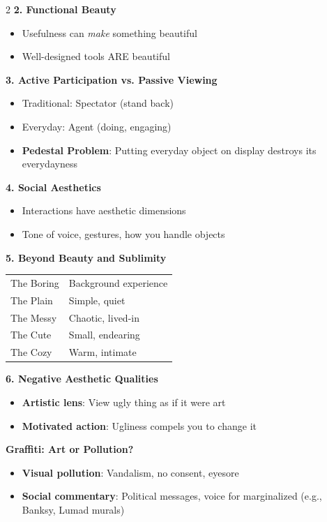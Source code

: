 \documentclass[11pt,letterpaper]{article}
\newcommand{\mysubsection}[1]{%
    \vspace{-0.2em}
    {\bfseries\color{sectioncolor}#1}%
    \vspace{0.1em}
}
\begin{document}
\begin{multicols*}{2}
\textbf{2. Functional Beauty}
\begin{itemize}[leftmargin=*, noitemsep, topsep=0pt]
    \item Usefulness can \textit{make} something beautiful
    \item Well-designed tools ARE beautiful
\end{itemize}

\textbf{3. Active Participation vs. Passive Viewing}
\begin{itemize}[leftmargin=*, noitemsep, topsep=0pt]
    \item Traditional: Spectator (stand back)
    \item Everyday: Agent (doing, engaging)
    \item \textbf{Pedestal Problem}: Putting everyday object on display destroys its everydayness
\end{itemize}

\textbf{4. Social Aesthetics}
\begin{itemize}[leftmargin=*, noitemsep, topsep=0pt]
    \item Interactions have aesthetic dimensions
    \item Tone of voice, gestures, how you handle objects
\end{itemize}

\textbf{5. Beyond Beauty and Sublimity}
\begin{tabular}{l|l}
    The Boring & Background experience \\
    The Plain & Simple, quiet \\
    The Messy & Chaotic, lived-in \\
    The Cute & Small, endearing \\
    The Cozy & Warm, intimate \\
\end{tabular}

\textbf{6. Negative Aesthetic Qualities}
\begin{itemize}[leftmargin=*, noitemsep, topsep=0pt]
    \item \textbf{Artistic lens}: View ugly thing as if it were art
    \item \textbf{Motivated action}: Ugliness compels you to change it
\end{itemize}

\mysubsection{Graffiti: Art or Pollution?}
\begin{itemize}[leftmargin=*, noitemsep, topsep=0pt]
    \item \textbf{Visual pollution}: Vandalism, no consent, eyesore
    \item \textbf{Social commentary}: Political messages, voice for marginalized (e.g., Banksy, Lumad murals)
\end{itemize}


\end{multicols*}
\end{document}
